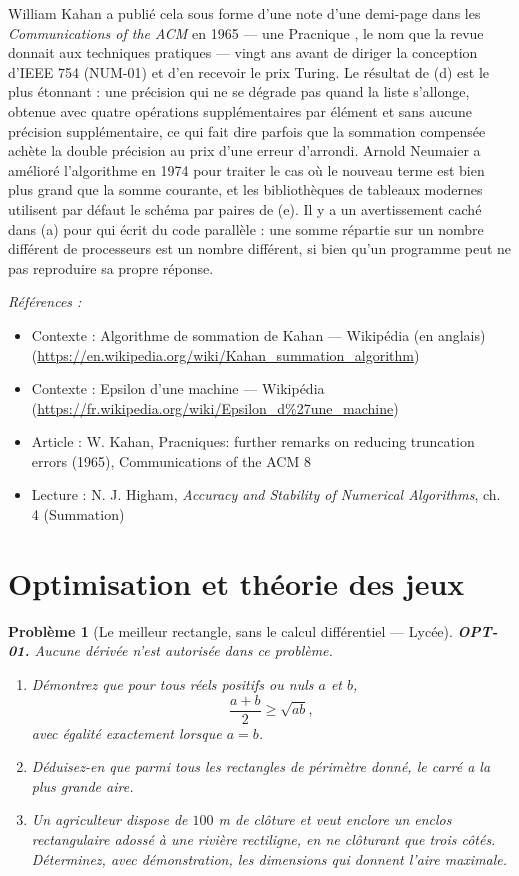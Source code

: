 \documentclass[11pt]{article}
\newtheorem{problem}{Problème}
\newenvironment{refs}{\par\small\noindent\emph{Références :}\begin{itemize}\setlength\itemsep{0pt}}{\end{itemize}\normalsize}
\begin{document}
\noindent William Kahan a publié cela sous forme d'une note d'une demi-page dans les \textit{Communications of the ACM} en 1965 --- une \og{} Pracnique \fg{}, le nom que la revue donnait aux techniques pratiques --- vingt ans avant de diriger la conception d'IEEE 754 (NUM-01) et d'en recevoir le prix Turing. Le résultat de (d) est le plus étonnant : une précision qui ne se dégrade pas quand la liste s'allonge, obtenue avec quatre opérations supplémentaires par élément et sans aucune précision supplémentaire, ce qui fait dire parfois que la sommation compensée achète la double précision au prix d'une erreur d'arrondi. Arnold Neumaier a amélioré l'algorithme en 1974 pour traiter le cas où le nouveau terme est bien plus grand que la somme courante, et les bibliothèques de tableaux modernes utilisent par défaut le schéma par paires de (e). Il y a un avertissement caché dans (a) pour qui écrit du code parallèle : une somme répartie sur un nombre différent de processeurs est un nombre différent, si bien qu'un programme peut ne pas reproduire sa propre réponse.

\begin{refs}
\item Contexte : Algorithme de sommation de Kahan --- Wikipédia (en anglais) (\url{https://en.wikipedia.org/wiki/Kahan_summation_algorithm})
\item Contexte : Epsilon d'une machine --- Wikipédia (\url{https://fr.wikipedia.org/wiki/Epsilon_d%27une_machine})
\item Article : W. Kahan, \og{} Pracniques: further remarks on reducing truncation errors \fg{} (1965), Communications of the ACM 8
\item Lecture : N. J. Higham, \textit{Accuracy and Stability of Numerical Algorithms}, ch. 4 (Summation)
\end{refs}

\bigskip


\section*{Optimisation et théorie des jeux}

\begin{problem}[{Le meilleur rectangle, sans le calcul différentiel --- Lycée}]
\textbf{OPT-01.} Aucune dérivée n'est autorisée dans ce problème.
\begin{enumerate}
\item[(a)] Démontrez que pour tous réels positifs ou nuls $a$ et $b$,
\[ \frac{a+b}{2} \ge \sqrt{ab}, \]
avec égalité exactement lorsque $a = b$.
\item[(b)] Déduisez-en que parmi tous les rectangles de périmètre donné, le carré a la plus grande aire.
\item[(c)] Un agriculteur dispose de $100$ m de clôture et veut enclore un enclos rectangulaire adossé à une rivière rectiligne, en ne clôturant que trois côtés. Déterminez, avec démonstration, les dimensions qui donnent l'aire maximale.
\end{enumerate}

\end{problem}
\end{document}
